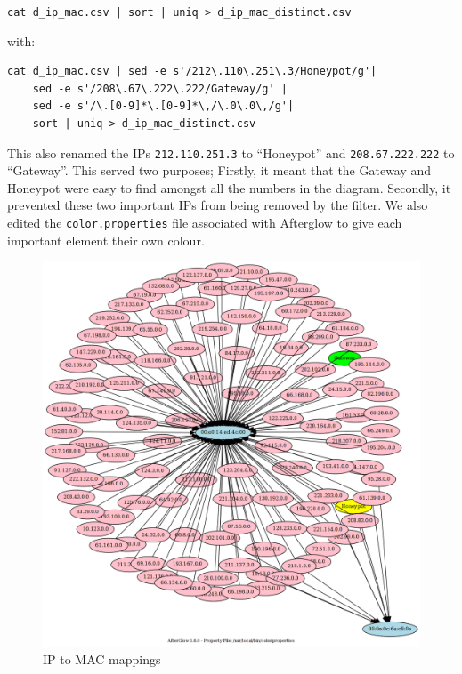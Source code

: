 \documentclass[a4paper,
    11pt,
    normalheadings,
    parindent,
    UKenglish,
    abstracton,
    ]{scrartcl}
\begin{document}
\verb#cat d_ip_mac.csv | sort | uniq > d_ip_mac_distinct.csv#

with:

\begin{verbatim}
cat d_ip_mac.csv | sed -e s'/212\.110\.251\.3/Honeypot/g'|
    sed -e s'/208\.67\.222\.222/Gateway/g' |
    sed -e s'/\.[0-9]*\.[0-9]*\,/\.0\.0\,/g'|
    sort | uniq > d_ip_mac_distinct.csv
\end{verbatim}

This also renamed the IPs \texttt{212.110.251.3} to ``Honeypot'' and \texttt{208.67.222.222} to ``Gateway''.
This served two purposes; Firstly, it meant that the Gateway and Honeypot were easy to find amongst all the numbers in the diagram.
Secondly, it prevented these two important IPs from being removed by the filter.
We also edited the \texttt{color.properties} file associated with Afterglow to give each important element their own colour.

\begin{figure}
    \begin{center}\includegraphics[width=\textwidth]{bin/colourmap.png}\end{center}
    \caption{IP to MAC mappings}
    \label{pic:colourmap}
\end{figure}
\end{document}
